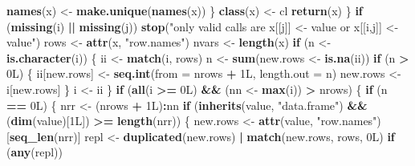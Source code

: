 \documentclass[]{book}
\newenvironment{Shaded}{\begin{snugshade}}{\end{snugshade}}
\newcommand{\ControlFlowTok}[1]{\textcolor[rgb]{0.13,0.29,0.53}{\textbf{#1}}}
\newcommand{\DataTypeTok}[1]{\textcolor[rgb]{0.13,0.29,0.53}{#1}}
\newcommand{\KeywordTok}[1]{\textcolor[rgb]{0.13,0.29,0.53}{\textbf{#1}}}
\newcommand{\NormalTok}[1]{#1}
\newcommand{\OperatorTok}[1]{\textcolor[rgb]{0.81,0.36,0.00}{\textbf{#1}}}
\newcommand{\StringTok}[1]{\textcolor[rgb]{0.31,0.60,0.02}{#1}}
\begin{document}
\begin{Shaded}
\begin{Highlighting}[]
{{{{{      \KeywordTok{names}\NormalTok{(x) <-}\StringTok{ }\KeywordTok{make.unique}\NormalTok{(}\KeywordTok{names}\NormalTok{(x))}
\NormalTok{    \}}
    \KeywordTok{class}\NormalTok{(x) <-}\StringTok{ }\NormalTok{cl}
    \KeywordTok{return}\NormalTok{(x)}
\NormalTok{  \}}
  \ControlFlowTok{if}\NormalTok{ (}\KeywordTok{missing}\NormalTok{(i) }\OperatorTok{||}\StringTok{ }\KeywordTok{missing}\NormalTok{(j)) }
    \KeywordTok{stop}\NormalTok{(}\StringTok{"only valid calls are x[[j]] <- value or x[[i,j]] <- value"}\NormalTok{)}
\NormalTok{  rows <-}\StringTok{ }\KeywordTok{attr}\NormalTok{(x, }\StringTok{"row.names"}\NormalTok{)}
\NormalTok{  nvars <-}\StringTok{ }\KeywordTok{length}\NormalTok{(x)}
  \ControlFlowTok{if}\NormalTok{ (n <-}\StringTok{ }\KeywordTok{is.character}\NormalTok{(i)) \{}
\NormalTok{    ii <-}\StringTok{ }\KeywordTok{match}\NormalTok{(i, rows)}
\NormalTok{    n <-}\StringTok{ }\KeywordTok{sum}\NormalTok{(new.rows <-}\StringTok{ }\KeywordTok{is.na}\NormalTok{(ii))}
    \ControlFlowTok{if}\NormalTok{ (n }\OperatorTok{>}\StringTok{ }\NormalTok{0L) \{}
\NormalTok{      ii[new.rows] <-}\StringTok{ }\KeywordTok{seq.int}\NormalTok{(}\DataTypeTok{from =}\NormalTok{ nrows }\OperatorTok{+}\StringTok{ }\NormalTok{1L, }\DataTypeTok{length.out =}\NormalTok{ n)}
\NormalTok{      new.rows <-}\StringTok{ }\NormalTok{i[new.rows]}
\NormalTok{    \}}
\NormalTok{    i <-}\StringTok{ }\NormalTok{ii}
\NormalTok{  \}}
  \ControlFlowTok{if}\NormalTok{ (}\KeywordTok{all}\NormalTok{(i }\OperatorTok{>=}\StringTok{ }\NormalTok{0L) }\OperatorTok{&&}\StringTok{ }\NormalTok{(nn <-}\StringTok{ }\KeywordTok{max}\NormalTok{(i)) }\OperatorTok{>}\StringTok{ }\NormalTok{nrows) \{}
    \ControlFlowTok{if}\NormalTok{ (n }\OperatorTok{==}\StringTok{ }\NormalTok{0L) \{}
\NormalTok{      nrr <-}\StringTok{ }\NormalTok{(nrows }\OperatorTok{+}\StringTok{ }\NormalTok{1L)}\OperatorTok{:}\NormalTok{nn}
      \ControlFlowTok{if}\NormalTok{ (}\KeywordTok{inherits}\NormalTok{(value, }\StringTok{"data.frame"}\NormalTok{) }\OperatorTok{&&}\StringTok{ }\NormalTok{(}\KeywordTok{dim}\NormalTok{(value)[1L]) }\OperatorTok{>=}\StringTok{ }
\StringTok{        }\KeywordTok{length}\NormalTok{(nrr)) \{}
\NormalTok{        new.rows <-}\StringTok{ }\KeywordTok{attr}\NormalTok{(value, }\StringTok{"row.names"}\NormalTok{)[}\KeywordTok{seq_len}\NormalTok{(nrr)]}
\NormalTok{        repl <-}\StringTok{ }\KeywordTok{duplicated}\NormalTok{(new.rows) }\OperatorTok{|}\StringTok{ }\KeywordTok{match}\NormalTok{(new.rows, }
\NormalTok{          rows, 0L)}
        \ControlFlowTok{if}\NormalTok{ (}\KeywordTok{any}\NormalTok{(repl)) }
}}}}}
\end{Highlighting}
\end{Shaded}
\end{document}
